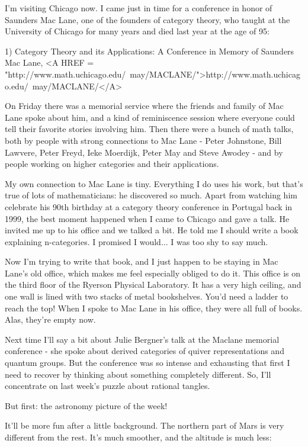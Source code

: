 

I'm visiting Chicago now.  I came just in time for a conference
in honor of Saunders Mac Lane, one of the founders of category
theory, who taught at the University of Chicago for many years
and died last year at the age of 95:

1) Category Theory and its Applications: A Conference in Memory
of Saunders Mac Lane, <A HREF = "http://www.math.uchicago.edu/~may/MACLANE/">http://www.math.uchicago.edu/~may/MACLANE/</A>

On Friday there was a memorial service where the friends and family 
of Mac Lane spoke about him, and a kind of reminiscence session 
where everyone could tell their favorite stories involving him.  
Then there were a bunch of math talks, both by people with strong 
connections to Mac Lane - Peter Johnstone, Bill Lawvere, Peter Freyd, 
Ieke Moerdijk, Peter May and Steve Awodey - and by people
working on higher categories and their applications.  

My own connection to Mac Lane is tiny.  Everything 
I do uses his work, but that's true of lots of mathematicians: he
discovered so much.  Apart from watching him celebrate his 90th birthday 
at a category theory conference in Portugal back in 1999, the best moment 
happened when I came to Chicago and gave a talk.  He invited me up to his 
office and we talked a bit.  He told me I should write a book explaining 
n-categories.  I promised I would... I was too shy to say much.

Now I'm trying to write that book, and I just happen to be staying in 
Mac Lane's old office, which makes me feel especially obliged to do it.  
This office is on the third floor of the Ryerson Physical Laboratory.
It has a very high ceiling, and one wall is lined with two stacks of 
metal bookshelves.  You'd need a ladder to reach the top!  When I spoke
to Mac Lane in his office, they were all full of books.  Alas, they're 
empty now.

Next time I'll say a bit about Julie Bergner's talk at the Maclane
memorial conference - she spoke about derived categories of quiver
representations and quantum groups.   But the conference was so intense 
and exhausting that first I need to recover by thinking about something 
completely different.  So, I'll concentrate on last week's puzzle about 
rational tangles.

But first: the astronomy picture of the week!

It'll be more fun after a little background.  The northern part of 
Mars is very different from the rest.   It's much smoother, and the 
altitude is much less:

